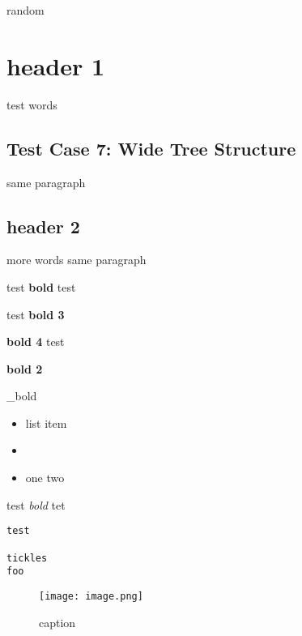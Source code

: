 \documentclass{article}
\begin{document}
random

\section{header 1}
test words

\subsection{Test Case 7: Wide Tree Structure}
same paragraph
\subsection{header 2}
more words same paragraph

test \textbf{bold} test

test \textbf{bold 3}

\textbf{bold 4} test

\textbf{bold 2}

\_bold\*


\begin{itemize}
\item list item
\item 
\item one two
\end{itemize}
test \emph{bold} tet


\begin{verbatim}
test

tickles
foo
\end{verbatim}
\begin{figure}[h]\centering\texttt{[image: image.png]}\caption{caption}\end{figure}
\end{document}
